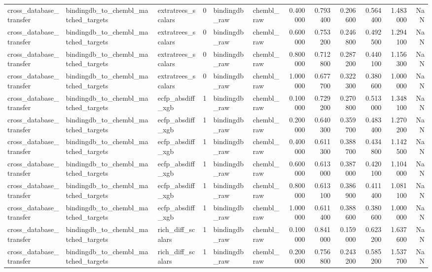 \begin{longtable}{lllrllrrrrrr}
cross\_database\_transfer & bindingdb\_to\_chembl\_matched\_targets & extratrees\_scalars & 0 & bindingdb\_raw & chembl\_raw & 0.400000 & 0.793400 & 0.206600 & 0.564400 & 1.483000 & NaN \\
cross\_database\_transfer & bindingdb\_to\_chembl\_matched\_targets & extratrees\_scalars & 0 & bindingdb\_raw & chembl\_raw & 0.600000 & 0.753200 & 0.246800 & 0.492500 & 1.294100 & NaN \\
cross\_database\_transfer & bindingdb\_to\_chembl\_matched\_targets & extratrees\_scalars & 0 & bindingdb\_raw & chembl\_raw & 0.800000 & 0.712800 & 0.287200 & 0.440100 & 1.156300 & NaN \\
cross\_database\_transfer & bindingdb\_to\_chembl\_matched\_targets & extratrees\_scalars & 0 & bindingdb\_raw & chembl\_raw & 1.000000 & 0.677700 & 0.322300 & 0.380600 & 1.000000 & NaN \\
cross\_database\_transfer & bindingdb\_to\_chembl\_matched\_targets & ecfp\_absdiff\_xgb & 1 & bindingdb\_raw & chembl\_raw & 0.100000 & 0.729200 & 0.270800 & 0.513000 & 1.348100 & NaN \\
cross\_database\_transfer & bindingdb\_to\_chembl\_matched\_targets & ecfp\_absdiff\_xgb & 1 & bindingdb\_raw & chembl\_raw & 0.200000 & 0.640300 & 0.359700 & 0.483400 & 1.270200 & NaN \\
cross\_database\_transfer & bindingdb\_to\_chembl\_matched\_targets & ecfp\_absdiff\_xgb & 1 & bindingdb\_raw & chembl\_raw & 0.400000 & 0.611300 & 0.388700 & 0.434800 & 1.142500 & NaN \\
cross\_database\_transfer & bindingdb\_to\_chembl\_matched\_targets & ecfp\_absdiff\_xgb & 1 & bindingdb\_raw & chembl\_raw & 0.600000 & 0.613000 & 0.387000 & 0.420100 & 1.104000 & NaN \\
cross\_database\_transfer & bindingdb\_to\_chembl\_matched\_targets & ecfp\_absdiff\_xgb & 1 & bindingdb\_raw & chembl\_raw & 0.800000 & 0.613100 & 0.386900 & 0.411400 & 1.081100 & NaN \\
cross\_database\_transfer & bindingdb\_to\_chembl\_matched\_targets & ecfp\_absdiff\_xgb & 1 & bindingdb\_raw & chembl\_raw & 1.000000 & 0.611400 & 0.388600 & 0.380600 & 1.000000 & NaN \\
cross\_database\_transfer & bindingdb\_to\_chembl\_matched\_targets & rich\_diff\_scalars & 1 & bindingdb\_raw & chembl\_raw & 0.100000 & 0.841000 & 0.159000 & 0.623200 & 1.637600 & NaN \\
cross\_database\_transfer & bindingdb\_to\_chembl\_matched\_targets & rich\_diff\_scalars & 1 & bindingdb\_raw & chembl\_raw & 0.200000 & 0.756800 & 0.243200 & 0.585200 & 1.537700 & NaN \\

\end{longtable}
